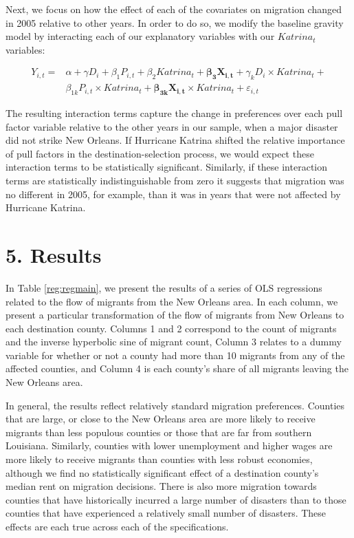\documentclass[]{article}
\begin{document}
Next, we focus on how the effect of each of the covariates on migration
changed in 2005 relative to other years. In order to do so, we modify
the baseline gravity model by interacting each of our explanatory
variables with our \({Katrina}_{t}\) variables:

\begin{equation} \label{eq:intreg}
\begin{split}
Y_{i,t} = &\alpha + \gamma {D}_{i} + \beta_1 {P}_{i,t} + \beta_2 {Katrina}_{t} + \mathbf{\beta_3} \mathbf{X_{i,t}} + \gamma_k {D}_{i} \times {Katrina}_{t} + \\
& \beta_{1k} {P}_{i,t} \times {Katrina}_{t} + \mathbf{\beta_{3k}} \mathbf{X_{i,t}} \times {Katrina}_{t} + \varepsilon_{i,t} 
\end{split}
\end{equation}

The resulting interaction terms capture the change in preferences over
each pull factor variable relative to the other years in our sample,
when a major disaster did not strike New Orleans. If Hurricane Katrina
shifted the relative importance of pull factors in the
destination-selection process, we would expect these interaction terms
to be statistically significant. Similarly, if these interaction terms
are statistically indistinguishable from zero it suggests that migration
was no different in 2005, for example, than it was in years that were
not affected by Hurricane Katrina.

\section{\texorpdfstring{5. Results
\label{sec:results}}{5. Results }}\label{results}

In Table \ref{reg:regmain}, we present the results of a series of OLS
regressions related to the flow of migrants from the New Orleans area.
In each column, we present a particular transformation of the flow of
migrants from New Orleans to each destination county. Columns 1 and 2
correspond to the count of migrants and the inverse hyperbolic sine of
migrant count, Column 3 relates to a dummy variable for whether or not a
county had more than 10 migrants from any of the affected counties, and
Column 4 is each county's share of all migrants leaving the New Orleans
area.

In general, the results reflect relatively standard migration
preferences. Counties that are large, or close to the New Orleans area
are more likely to receive migrants than less populous counties or those
that are far from southern Louisiana. Similarly, counties with lower
unemployment and higher wages are more likely to receive migrants than
counties with less robust economies, although we find no statistically
significant effect of a destination county's median rent on migration
decisions. There is also more migration towards counties that have
historically incurred a large number of disasters than to those counties
that have experienced a relatively small number of disasters. These
effects are each true across each of the specifications.
\end{document}
